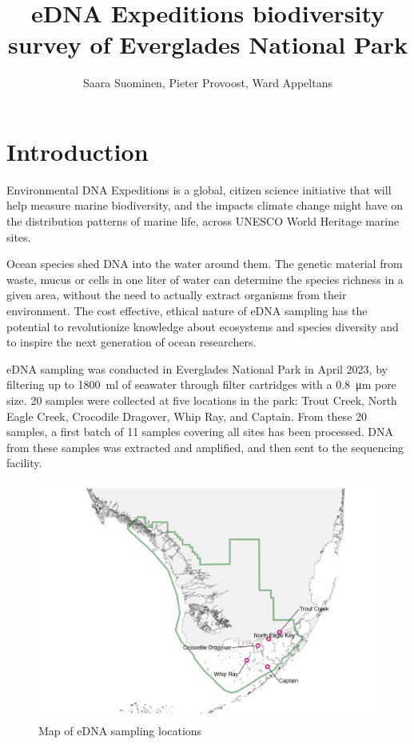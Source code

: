 \documentclass[10pt]{article}
\title{eDNA Expeditions biodiversity survey of Everglades National Park}
\author{Saara Suominen, Pieter Provoost, Ward Appeltans}
\begin{document}
\maketitle

\section{Introduction}

\begin{multicols}{2}
Environmental DNA Expeditions is a global, citizen science initiative that will help measure marine biodiversity, and the impacts climate change might have on the distribution patterns of marine life, across UNESCO World Heritage marine sites.

Ocean species shed DNA into the water around them. The genetic material from waste, mucus or cells in one liter of water can determine the species richness in a given area, without the need to actually extract organisms from their environment.
The cost effective, ethical nature of eDNA sampling has the potential to revolutionize knowledge about ecosystems and species diversity and to inspire the next generation of ocean researchers.

eDNA sampling was conducted in Everglades National Park in April 2023, by filtering up to \SI{1800}{\milli\litre} of seawater through filter cartridges with a \SI{0.8}{\micro\metre} pore size. 20 samples were collected at five locations in the park: Trout Creek, North Eagle Creek, Crocodile Dragover, Whip Ray, and Captain. From these 20 samples, a first batch of 11 samples covering all sites has been processed. DNA from these samples was extracted and amplified, and then sent to the sequencing facility.

\end{multicols}

\begin{figure}[h]
\centering
\includegraphics[width=\textwidth]{map}
\caption{Map of eDNA sampling locations}
\end{figure}
\end{document}
